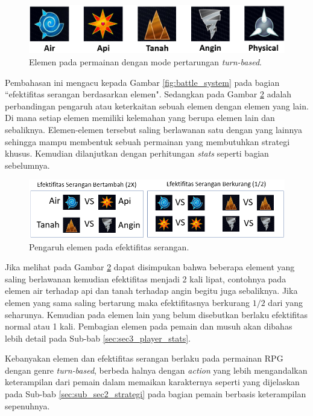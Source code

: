 \begin{subs}
\begin{enumerate}[label=\textbf{\arabic*).}]
		\begin{figure} [!h] \centering
			\includegraphics[scale=0.45]{img/element.png}
			\caption{Elemen pada permainan dengan mode pertarungan \textit{turn-based}.}
			\label{fig:elemen}
		\end{figure}
		
		Pembahasan ini mengacu kepada Gambar \ref{fig:battle_system} pada bagian ``efektifitas serangan berdasarkan elemen". Sedangkan pada Gambar \ref{fig:efektifitas} adalah perbandingan pengaruh atau keterkaitan sebuah elemen dengan elemen yang lain. Di mana setiap elemen memiliki kelemahan yang berupa elemen lain dan sebaliknya. Elemen-elemen tersebut saling berlawanan satu dengan yang lainnya sehingga mampu membentuk sebuah permainan yang membutuhkan strategi khusus. Kemudian dilanjutkan dengan perhitungan \textit{stats} seperti bagian sebelumnya.
		\vspace{1ex}
		
		\begin{figure} [!h] \centering
			\includegraphics[scale=0.65]{img/efektifitas.png}
			\caption{Pengaruh elemen pada efektifitas serangan.}
			\label{fig:efektifitas}
		\end{figure}
		
		Jika melihat pada Gambar \ref{fig:efektifitas} dapat disimpukan bahwa beberapa element yang saling berlawanan kemudian efektifitas menjadi 2 kali lipat, contohnya pada elemen air terhadap api dan tanah terhadap angin begitu juga sebaliknya. Jika elemen yang sama saling bertarung maka efektifitasnya berkurang $1/2$ dari yang seharunya. Kemudian pada elemen lain yang belum disebutkan berlaku efektifitas normal atau 1 kali. Pembagian elemen pada pemain dan musuh akan dibahas lebih detail pada Sub-bab \ref{sec:sec3_player_stats}.
		\vspace{1ex}
		
		Kebanyakan elemen dan efektifitas serangan berlaku pada permainan RPG dengan genre \textit{turn-based}, berbeda halnya dengan \textit{action} yang lebih mengandalkan keterampilan dari pemain dalam memaikan karakternya seperti yang dijelaskan pada Sub-bab \ref{sec:sub_sec2_strategi} pada bagian pemain berbasis keterampilan sepenuhnya.
		\vspace{1ex}
		

\end{enumerate}
\end{subs}
